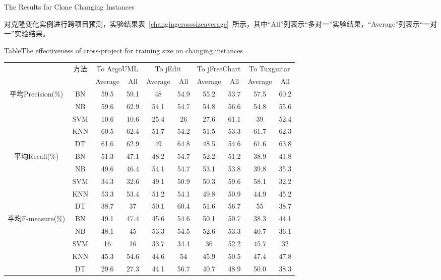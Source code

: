 {The Results for Clone Changing Instances}

对克隆变化实例进行跨项目预测，实验结果表~\ref{changingcrosssizeaverage}~所示，其中“All”列表示“多对一”实验结果，“Average”列表示“一对一”实验结果。

\begin{table} [h]
{Table$\!$}{The effectiveness of cross-project for training size on changing instances}
\vspace{0.5em}
\centering
\footnotesize
\begin{tabular}{cccccccccc}
\toprule[1.5pt]
~\multirow{2}{*}{指标}&\multirow{2}{*}{方法}&\multicolumn{2}{c}{To ArgoUML}&\multicolumn{2}{c}{To jEdit}&\multicolumn{2}{c}{To jFreeChart}&\multicolumn{2}{c}{To  Tuxguitar}\\
\cline{3-10}
~&~&{Average}&{All}&{Average}&{All}&{Average}&{All}&{Average}&{All}\\
\midrule[1pt]
\multirow{5}{*}{平均Precision(\%)}
&BN&59.5&59.1&48&54.9&55.2&53.7&57.5&60.2\\
&NB&59.6&62.9&54.1&54.7&54.8&56.6&54.8&55.6\\
&SVM&10.6&10.6&25.4&26&	27.6&61.1&	39&52.4\\
&KNN&60.5&62.4&51.7&54.2&51.5&53.3&61.7&62.3\\
&DT	&61.6&	62.9&49&64.8&48.5&54.6&61.6&63.8\\
\hline
\multirow{5}{*}{平均Recall(\%)}								
&BN&51.3&47.1&48.2&54.7&52.2&51.2&38.9&41.8\\
&NB&49.6&46.4&54.1&54.7&53.1&53.8&39.8&35.3\\
&SVM&34.3&32.6&49.1&50.9&50.3&59.6&58.1&32.2\\
&KNN&53.3&53.4&51.2&54.1&49.8&50.9&44.9&45.2\\
&DT	&38.7&	37&	50.1	&60.4&	51.6&	56.7&	55&	38.7\\
\hline
\multirow{5}{*}{平均F-measure(\%)}								
&BN&	49.1&47.4&	45.6&	54.6&50.1&50.7&38.3&44.1\\
&NB&	48.1&	45&53.3&54.5&52.6&53.3&	40.7&	36.1\\
&SVM&	16	&16&33.7&34.4&36&52.2&45.7&32\\
&KNN&	45.3&	54.6&44.6&54&45.9&50.5&47.4&47.8\\
&DT&	29.6&27.3&44.1&56.7&40.7&48.9&50.0&38.3\\
\bottomrule[1.5pt]
\end{tabular}
\end{table}

